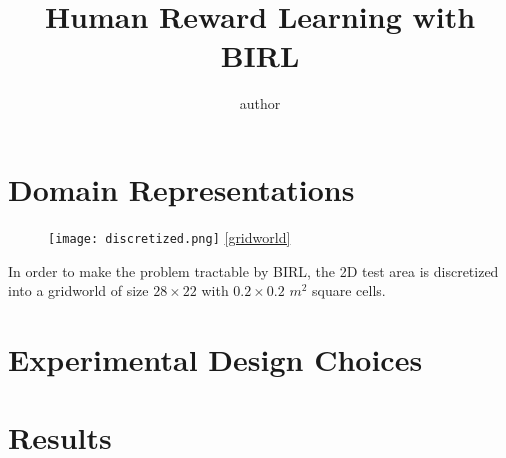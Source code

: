 \documentclass[12pt]{article}
\title{\LARGE \bf  Human Reward Learning with BIRL }
\author{author}
\begin{document}
\thispagestyle{fancy}
    \maketitle
    \pagestyle{fancy}

\section{Domain Representations}

\begin{figure}[h!]
     \texttt{[image: discretized.png]}
     \label{Example of a Discretized Gridworld}
     \ref{gridworld}
\end{figure}

In order to make the problem tractable by BIRL, the 2D test area is discretized into a gridworld of size $28\times 22$ with $0.2 \times 0.2$ $m^2$ square cells.  

\section{Experimental Design Choices}

\section{Results}
\end{document}
